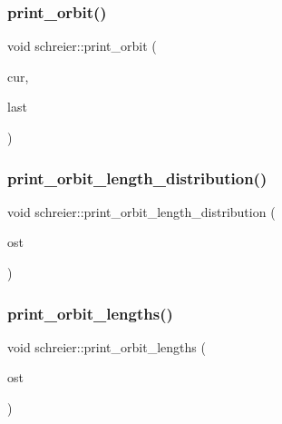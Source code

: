 \mbox{\label{classschreier_ab8236b64028fe047d681ca0d6435cf82}} 
\subsubsection{\texorpdfstring{print\+\_\+orbit()}{print\_orbit()}\hspace{0.1cm}{\footnotesize\ttfamily [3/3]}}
{\footnotesize\ttfamily void schreier\+::print\+\_\+orbit (\begin{DoxyParamCaption}\item[{\mbox{\hyperlink{galois_8h_a09fddde158a3a20bd2dcadb609de11dc}{I\+NT}}}]{cur,  }\item[{\mbox{\hyperlink{galois_8h_a09fddde158a3a20bd2dcadb609de11dc}{I\+NT}}}]{last }\end{DoxyParamCaption})}

\mbox{\label{classschreier_a0464626aa62056d355b34898518c4589}} 
\subsubsection{\texorpdfstring{print\+\_\+orbit\+\_\+length\+\_\+distribution()}{print\_orbit\_length\_distribution()}}
{\footnotesize\ttfamily void schreier\+::print\+\_\+orbit\+\_\+length\+\_\+distribution (\begin{DoxyParamCaption}\item[{ostream \&}]{ost }\end{DoxyParamCaption})}

\mbox{\label{classschreier_a8c7409ed71c0d8f234555eec3bc028a3}} 
\subsubsection{\texorpdfstring{print\+\_\+orbit\+\_\+lengths()}{print\_orbit\_lengths()}}
{\footnotesize\ttfamily void schreier\+::print\+\_\+orbit\+\_\+lengths (\begin{DoxyParamCaption}\item[{ostream \&}]{ost }\end{DoxyParamCaption})}

